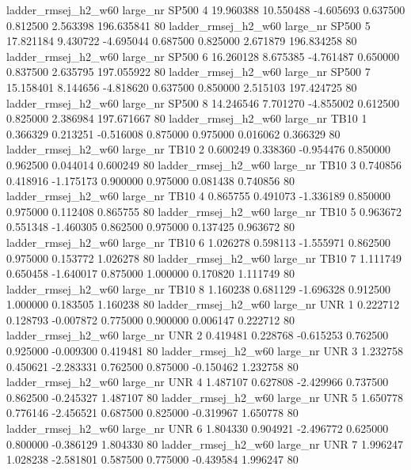 ladder_rmsej_h2_w60   large_nr    SP500                 4 19.960388 10.550488  -4.605693 0.637500 0.812500  2.563398  196.635841 80
ladder_rmsej_h2_w60   large_nr    SP500                 5 17.821184  9.430722  -4.695044 0.687500 0.825000  2.671879  196.834258 80
ladder_rmsej_h2_w60   large_nr    SP500                 6 16.260128  8.675385  -4.761487 0.650000 0.837500  2.635795  197.055922 80
ladder_rmsej_h2_w60   large_nr    SP500                 7 15.158401  8.144656  -4.818620 0.637500 0.850000  2.515103  197.424725 80
ladder_rmsej_h2_w60   large_nr    SP500                 8 14.246546  7.701270  -4.855002 0.612500 0.825000  2.386984  197.671667 80
ladder_rmsej_h2_w60   large_nr     TB10                 1  0.366329  0.213251  -0.516008 0.875000 0.975000  0.016062    0.366329 80
ladder_rmsej_h2_w60   large_nr     TB10                 2  0.600249  0.338360  -0.954476 0.850000 0.962500  0.044014    0.600249 80
ladder_rmsej_h2_w60   large_nr     TB10                 3  0.740856  0.418916  -1.175173 0.900000 0.975000  0.081438    0.740856 80
ladder_rmsej_h2_w60   large_nr     TB10                 4  0.865755  0.491073  -1.336189 0.850000 0.975000  0.112408    0.865755 80
ladder_rmsej_h2_w60   large_nr     TB10                 5  0.963672  0.551348  -1.460305 0.862500 0.975000  0.137425    0.963672 80
ladder_rmsej_h2_w60   large_nr     TB10                 6  1.026278  0.598113  -1.555971 0.862500 0.975000  0.153772    1.026278 80
ladder_rmsej_h2_w60   large_nr     TB10                 7  1.111749  0.650458  -1.640017 0.875000 1.000000  0.170820    1.111749 80
ladder_rmsej_h2_w60   large_nr     TB10                 8  1.160238  0.681129  -1.696328 0.912500 1.000000  0.183505    1.160238 80
ladder_rmsej_h2_w60   large_nr      UNR                 1  0.222712  0.128793  -0.007872 0.775000 0.900000  0.006147    0.222712 80
ladder_rmsej_h2_w60   large_nr      UNR                 2  0.419481  0.228768  -0.615253 0.762500 0.925000 -0.009300    0.419481 80
ladder_rmsej_h2_w60   large_nr      UNR                 3  1.232758  0.450621  -2.283331 0.762500 0.875000 -0.150462    1.232758 80
ladder_rmsej_h2_w60   large_nr      UNR                 4  1.487107  0.627808  -2.429966 0.737500 0.862500 -0.245327    1.487107 80
ladder_rmsej_h2_w60   large_nr      UNR                 5  1.650778  0.776146  -2.456521 0.687500 0.825000 -0.319967    1.650778 80
ladder_rmsej_h2_w60   large_nr      UNR                 6  1.804330  0.904921  -2.496772 0.625000 0.800000 -0.386129    1.804330 80
ladder_rmsej_h2_w60   large_nr      UNR                 7  1.996247  1.028238  -2.581801 0.587500 0.775000 -0.439584    1.996247 80
